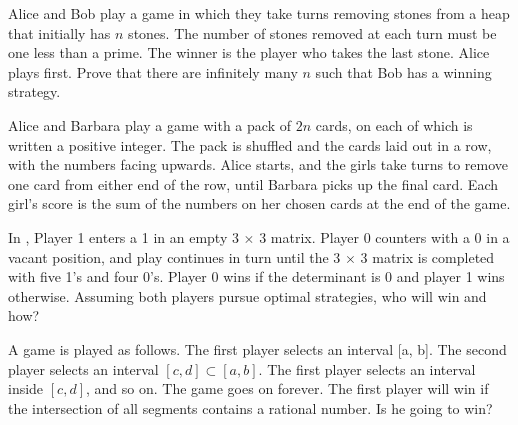 \documentclass{article}
\begin{document}
 Alice and Bob play a game in which they take turns removing stones from a heap that initially has \(n\) stones. The number of stones removed at
each turn must be one less than a prime. { }The winner is the player who takes the last stone. { }Alice plays first. { }Prove that there are infinitely
many \(n\) such that Bob has a winning strategy.

\pmb{  { }}Alice and Barbara play a game with a pack of \(2n\) cards, on each of which is written a positive integer. The pack is shuffled and the
cards laid out in a row, with the numbers facing upwards. Alice starts, and the girls take turns to remove one card from either end of the row, until
Barbara picks up the final card. Each girl{'}s score is the sum of the numbers on her chosen cards at the end of the game.

In , Player 1 enters a 1 in an empty 3 $\times $ 3 matrix. Player 0 counters with a 0 in a vacant position, and play
continues in turn until the 3 $\times $ 3 matrix is completed with five 1{'}s and four 0{'}s. Player 0 wins if the determinant is 0 and player 1
wins otherwise. Assuming both players pursue optimal strategies, who will win and how?

A game is played as follows. The first player selects an interval [a, b]. The second player selects an interval \([c, d] \subset  [a, b]\). The first
player selects an interval inside \([c, d]\), and so on. The game goes on forever. The first player will win if the intersection of all segments
contains a rational number. Is he going to win?
\end{document}
